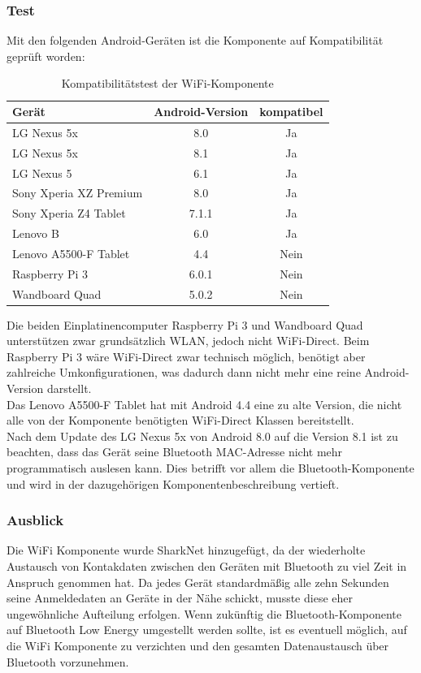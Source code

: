 \subsubsection{Test}
Mit den folgenden Android-Geräten ist die Komponente auf Kompatibilität geprüft worden:
\begin{table}[H]
	\begin{center}
		\caption{Kompatibilitätstest der WiFi-Komponente}
		\label{tab:dimensions}
		\begin{tabular}{l|c|c} 			
			Gerät & Android-Version & kompatibel \\
			\hline
			LG Nexus 5x & 8.0 & Ja\\
			LG Nexus 5x & 8.1 & Ja\\
			LG Nexus 5 & 6.1 & Ja\\
			Sony Xperia XZ Premium & 8.0 & Ja\\
			Sony Xperia Z4 Tablet & 7.1.1 & Ja\\
			Lenovo B & 6.0 & Ja\\
			Lenovo A5500-F Tablet & 4.4 & Nein\\
			Raspberry Pi 3 & 6.0.1 & Nein\\	
			Wandboard Quad & 5.0.2 & Nein\\			
		\end{tabular}
	\end{center}
\end{table}
Die beiden Einplatinencomputer Raspberry Pi 3 und Wandboard Quad unterstützen zwar grundsätzlich WLAN, jedoch nicht WiFi-Direct. Beim Raspberry Pi 3 wäre WiFi-Direct zwar technisch möglich, benötigt aber zahlreiche Umkonfigurationen, was dadurch dann nicht mehr eine reine Android-Version darstellt. 
\\Das Lenovo A5500-F Tablet hat mit Android 4.4 eine zu alte Version, die nicht alle von der Komponente benötigten WiFi-Direct Klassen bereitstellt. 
\\Nach dem Update des LG Nexus 5x von Android 8.0 auf die Version 8.1 ist zu beachten, dass das Gerät seine Bluetooth MAC-Adresse nicht mehr programmatisch auslesen kann. Dies betrifft vor allem die Bluetooth-Komponente und wird in der dazugehörigen Komponentenbeschreibung vertieft.  

\subsubsection{Ausblick}
Die WiFi Komponente wurde SharkNet hinzugefügt, da der wiederholte Austausch von Kontakdaten zwischen den Geräten mit Bluetooth zu viel Zeit in Anspruch genommen hat. Da jedes Gerät standardmäßig alle zehn Sekunden seine Anmeldedaten an Geräte in der Nähe schickt, musste diese eher ungewöhnliche Aufteilung erfolgen. Wenn zukünftig die Bluetooth-Komponente auf Bluetooth Low Energy umgestellt werden sollte, ist es eventuell möglich, auf die WiFi Komponente zu verzichten und den gesamten Datenaustausch über Bluetooth vorzunehmen. 
\newpage